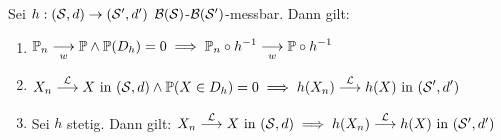 \begin{satz}\enter\label{satz4.10ContinuousMappingTheorem}
	Sei $h:(\S,d)\to(\S',d')$ $\B(\S)$-$\B(\S')$-messbar.
	Dann gilt:
	\begin{enumerate}[label=(\arabic*)]
		\item $\begin{aligned}
			\P_n\stackrelnew{w}{}{\longrightarrow} \P\wedge \P(D_h)=0
			\implies \P_n\circ h^{-1}\stackrelnew{w}{}{\longrightarrow} \P\circ h^{-1}
		\end{aligned}$
		\item $\begin{aligned}
			X_n\stackrel{\L}{\longrightarrow}X\text{ in }(\S,d)\wedge\P(X\in D_h)=0
			\implies h(X_n)\stackrel{\L}{\longrightarrow} h(X)\text{ in }(\S',d') 
		\end{aligned}$
		\item Sei $h$ stetig. Dann gilt: $X_n\stackrel{\L}{\longrightarrow}X\text{ in }(\S,d)\implies h(X_n)\stackrel{\L}{\longrightarrow} h(X)\text{ in }(\S',d')$ 
	\end{enumerate}
\end{satz}

